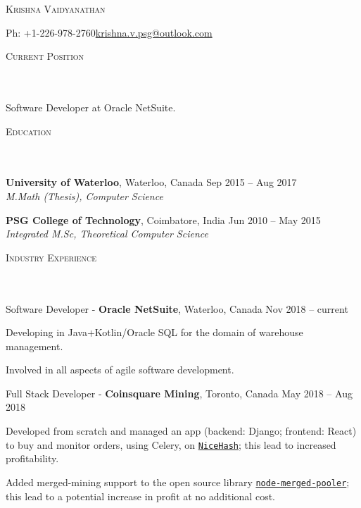 \documentclass{article}
\newcommand{\header}[1]{{
\hspace*{-15pt}\vspace*{6pt} \textsc{#1}} \vspace*{-6pt} 
\lineunder
}
\newcommand{\lineunder}{
\vspace*{-8pt} \\ \hspace*{-18pt} 
\hrulefill \\
}
\newcommand{\content}{
\vspace*{2pt}%
}
\newcommand{\college}[5]{\vspace*{2pt}%
#1 \hfill #2 \\ #3 \hfill #4
\vspace*{5pt}
}
\newcommand{\employer}[4]{{
\vspace*{2pt}%
#1 - \textbf{#2}, #3 \hfill #4 \vspace*{2pt}}
}
\renewcommand{\labelitemii}{
$\vcenter{\hbox{\tiny$\bullet$}}$\hspace*{-3pt}
}
\newenvironment{bullet-list-minor}{
\begin{list}{\labelitemii}{\setlength\leftmargin{15pt} 
\topsep 0pt \itemsep -2pt}}{\vspace*{4pt}\end{list}
}
\begin{document}
\small
\smallskip
\vspace*{-35pt}

\begin{center}
    {\large \scshape{Krishna Vaidyanathan}}
\end{center}
    Ph: +1-226-978-2760\hfill \href{mailto:krishna.v.psg@outlook.com}{krishna.v.psg@outlook.com} \\
\vspace{15pt}

\header{Current Position}
    \content{Software Developer at Oracle NetSuite.}


\vspace*{4pt}%
\header{Education}
    \college{\textbf{University of Waterloo}, Waterloo, Canada}{Sep 2015 -- Aug 2017}
    {\textit{M.Math (Thesis), Computer Science}}{}\\

    \college{\textbf{PSG College of Technology}, Coimbatore, India}{Jun 2010 -- May 2015}
    {\textit{Integrated M.Sc, Theoretical Computer Science}}{}\\

\vspace*{4pt}%
\header{Industry Experience}
  \employer{Software Developer}{Oracle NetSuite}{Waterloo, Canada}{Nov 2018 -- current}{}
	\begin{bullet-list-minor}
	\item Developing in Java+Kotlin/Oracle SQL for the domain of warehouse management.
	\item Involved in all aspects of agile software development.
    \end{bullet-list-minor}

    \employer{Full Stack Developer}{Coinsquare Mining}{Toronto, Canada}{May 2018 -- Aug 2018}{}
	\begin{bullet-list-minor}
	\item Developed from scratch and managed an app (backend: Django; frontend: React) to buy and monitor
orders, using Celery, on \texttt{\href{www.nicehash.com}{NiceHash}};  this lead to increased profitability. 
	\item Added merged-mining support to the open source library \texttt{\href{https://github.com/UNOMP/node-merged-pool}{node-merged-pooler}}; this lead to a potential increase in profit at no additional cost.
    \end{bullet-list-minor}
\end{document}
